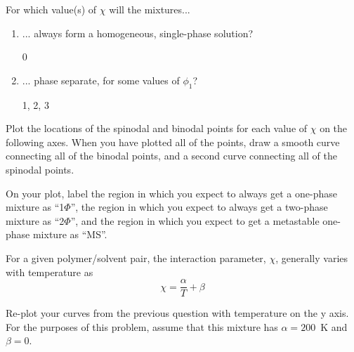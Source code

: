 \begin{activity}
\begin{ctqs}
	\question For which value(s) of $\chi$ will the mixtures...
	
		\begin{enumerate}
			\item ... always form a homogeneous, single-phase solution?
				
				\begin{solution}[0.75in]
					0
				\end{solution}
			
			\item ... phase separate, for some values of $\phi_1$?
				\begin{solution}[0.75in]
					1, 2, 3
				\end{solution}
		\end{enumerate}
		
	\question Plot the locations of the spinodal and binodal points for each value of $\chi$ on the following axes.  When you have plotted all of the points, draw a smooth curve connecting all of the binodal points, and a second curve connecting all of the spinodal points.
	
		\begin{solution}[2in]
		\end{solution}
		
	\question On your plot, label the region in which you expect to always get a one-phase mixture as ``1$\Phi$'', the region in which you expect to always get a two-phase mixture as ``2$\Phi$'', and the region in which you expect to get a metastable one-phase mixture as ``MS''.
		
\end{ctqs}


\begin{infobox}
	For a given polymer/solvent pair, the interaction parameter, $\chi$, generally varies with temperature as
	\begin{equation*}
		\chi = \frac{\alpha}{T} + \beta
	\end{equation*}
\end{infobox}


\begin{ctqs}

	\question Re-plot your curves from the previous question with temperature on the y axis.  For the purposes of this problem, assume that this mixture has $\alpha=200$~K and $\beta=0$.
		\label{\labelbase:ctq:plotT}
	

\end{ctqs}
\end{activity}
